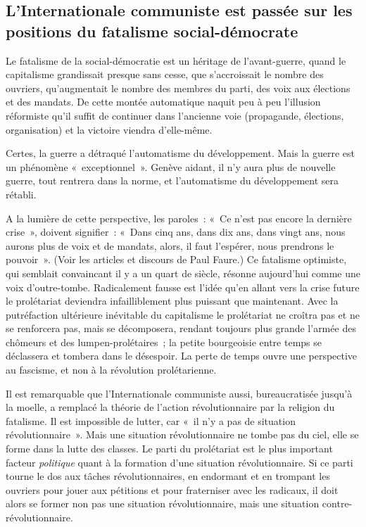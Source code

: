 \documentclass[french,twoside]{book} %
\begin{document}
 \subsection[{L’Internationale communiste est passée sur les positions du fatalisme social-démocrate}]{L’Internationale communiste est passée sur les positions du fatalisme social-démocrate}
\noindent Le fatalisme de la social-démocratie est un héritage de l’avant-guerre, quand le capitalisme grandissait presque sans cesse, que s’accroissait le nombre des ouvriers, qu’augmentait le nombre des membres du parti, des voix aux élections et des mandats. De cette montée automatique naquit peu à peu l’illusion réformiste qu’il suffit de continuer dans l’ancienne voie (propagande, élections, organisation) et la victoire viendra d’elle-même.\par
Certes, la guerre a détraqué l’automatisme du développement. Mais la guerre est un phénomène « exceptionnel ». Genève aidant, il n’y aura plus de nouvelle guerre, tout rentrera dans la norme, et l’automatisme du développement sera rétabli.\par
A la lumière de cette perspective, les paroles : « Ce n’est pas encore la dernière crise », doivent signifier : « Dans cinq ans, dans dix ans, dans vingt ans, nous aurons plus de voix et de mandats, alors, il faut l’espérer, nous prendrons le pouvoir ». (Voir les articles et discours de Paul Faure.) Ce fatalisme optimiste, qui semblait convaincant il y a un quart de siècle, résonne aujourd’hui comme une voix d’outre-tombe. Radicalement fausse est l’idée qu’en allant vers la crise future le prolétariat deviendra infailliblement plus puissant que maintenant. Avec la putréfaction ultérieure inévitable du capitalisme le prolétariat ne croîtra pas et ne se renforcera pas, mais se décomposera, rendant toujours plus grande l’armée des chômeurs et des lumpen-prolétaires ; la petite bourgeoisie entre temps se déclassera et tombera dans le désespoir. La perte de temps ouvre une perspective au fascisme, et non à la révolution prolétarienne.\par
Il est remarquable que l’Internationale communiste aussi, bureaucratisée jusqu’à la moelle, a remplacé la  théorie de l’action révolutionnaire par la religion du fatalisme. Il est impossible de lutter, car « il n’y a pas de situation révolutionnaire ». Mais une situation révolutionnaire ne tombe pas du ciel, elle se forme dans la lutte des classes. Le parti du prolétariat est le plus important facteur \emph{politique} quant à la formation d’une situation révolutionnaire. Si ce parti tourne le dos aux tâches révolutionnaires, en endormant et en trompant les ouvriers pour jouer aux pétitions et pour fraterniser avec les radicaux, il doit alors se former non pas une situation révolutionnaire, mais une situation contre-révolutionnaire.
\end{document}
